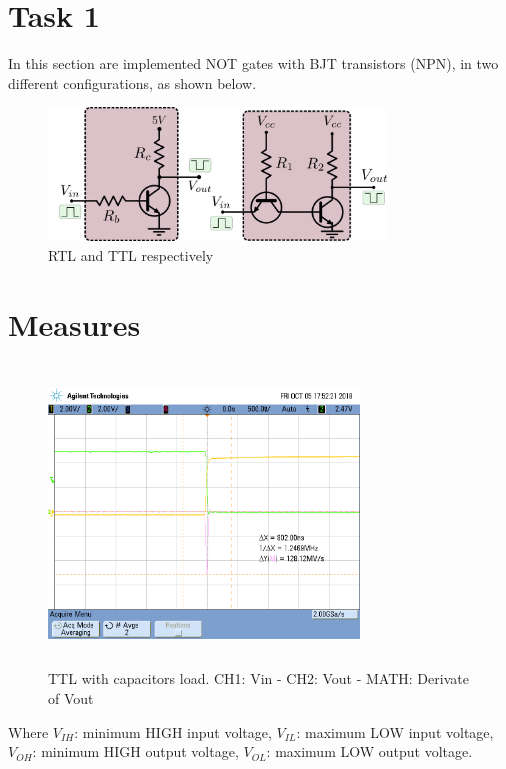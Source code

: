 \newpage
\section*{Task 1}
In this section are implemented NOT gates with BJT transistors (NPN), in two different configurations,
 as shown below.

\begin{figure}[H] 
\begin{center}
\includegraphics[width=0.80\textwidth]{data/1total.png}
\end{center}
\caption{RTL and TTL respectively}
\label{fig:ej1a}
\end{figure} 


\section*{Measures}
\begin{figure}[H] 
\begin{center}
\includegraphics[width=8.25cm,height=8cm]{data/imax1.png}
\end{center}
\caption{TTL with capacitors load. CH1: Vin - CH2: Vout - MATH: Derivate of Vout}
\label{fig:measures}
\end{figure} 

Where $V_{IH}$: minimum HIGH input voltage, $V_{IL}$: maximum LOW input voltage, $V_{OH}$: minimum HIGH output voltage, $V_{OL}$: maximum LOW output voltage.

